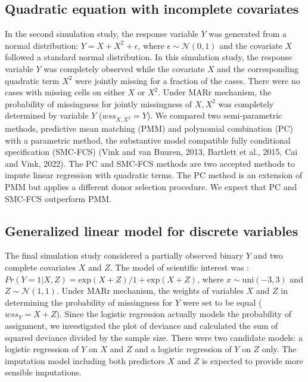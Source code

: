 \documentclass[12pt, fullpage, a4paper]{article}
\begin{document}
\subsection{Quadratic equation with incomplete covariates}
In the second simulation study, the response variable $Y$ was generated from a normal distribution: $Y = X + X^2 + \epsilon$, where $\epsilon \sim \mathcal{N}(0, 1)$ and the covariate $X$ followed a standard normal distribution. In this simulation study, the response variable $Y$ was completely observed while the covariate $X$ and the corresponding quadratic term $X^2$ were jointly missing for a fraction of the cases. There were no cases with missing cells on either $X$ or $X^2$. Under MARr mechanism, the probability of missingness for jointly missingness of ${X, X^2}$ was completely determined by variable $Y$ ($wss_{X, X^2} = Y$). We compared two semi-parametric methods, predictive mean matching (PMM) and polynomial combination (PC) with a parametric method, the substantive model compatible fully conditional specification (SMC-FCS) (Vink and van Buuren, 2013, Bartlett et al., 2015, Cai and Vink, 2022\nocite{cai2022note}). The PC and SMC-FCS methods are two accepted methods to impute linear regression with quadratic terms. The PC method is an extension of PMM but applies a different donor selection procedure. We expect that PC and SMC-FCS outperform PMM.  


\subsection{Generalized linear model for discrete variables}
The final simulation study considered a partially observed binary $Y$ and two complete covariates $X$ and $Z$. The model of scientific interest was : $Pr (Y = 1 | X, Z) = \text{exp}(X + Z) / 1 + \text{exp}(X + Z)$,
where $x \sim \text{uni}(-3 , 3)$ and $Z \sim \mathcal{N}(1, 1)$. Under MARr mechanism, the weights of variables $X$ and $Z$ in determining the probability of missingness for $Y$ were set to be equal ($wss_{Y} = X + Z$). Since the logistic regression actually models the probability of assignment, we investigated the plot of deviance and calculated the sum of squared deviance divided by the sample size. There were two candidate models: a logistic regression of $Y$ on $X$ and $Z$ and a logistic regression of $Y$ on $Z$ only. The imputation model including both predictors $X$ and $Z$ is expected to provide more sensible imputations. 
\end{document}
